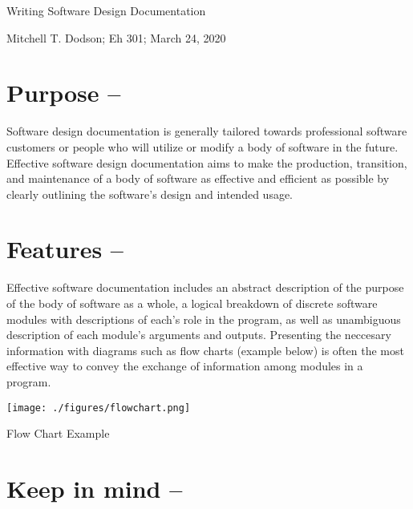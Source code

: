 \documentclass[12pt]{article}
\begin{document}
\begin{center}\LARGE
Writing Software Design Documentation
\end{center}

\begin{center}\large
	Mitchell T. Dodson; Eh 301; March 24, 2020
\end{center}

\begin{multicols}{2}

	\section{Purpose --}

	Software design documentation is generally tailored towards professional software customers or people who will utilize or modify a body of software in the future. Effective software design documentation aims to make the production, transition, and maintenance of a body of software as effective and efficient as possible by clearly outlining the software's design and intended usage.

	\section{Features -- }

	Effective software documentation includes an abstract description of the purpose of the body of software as a whole, a logical breakdown of discrete software modules with descriptions of each's role in the program, as well as unambiguous description of each module's arguments and outputs. Presenting the neccesary information with diagrams such as flow charts (example below) is often the most effective way to convey the exchange of information among modules in a program.

	\vspace{1em}
	\begin{center}
		\texttt{[image: ./figures/flowchart.png]}

		\vspace{.4em}
		Flow Chart Example
	\end{center}

	\columnbreak

	\section{Keep in mind -- }


\end{multicols}
\end{document}
